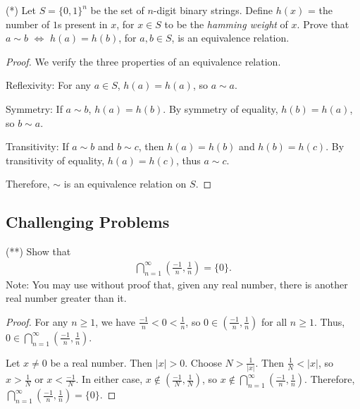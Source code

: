 \documentclass[12pt]{article}
\begin{document}
\begin{problem}
(*) Let $S = \{0,1\}^n$ be the set of $n$-digit binary strings. Define $h(x)$ = the number of $1$s present in $x$, for $x \in S$ to be the \emph{hamming weight} of $x$. Prove that $a \sim b$ $\iff$ $h(a) = h(b)$, for $a,b \in S$, is an equivalence relation.

\begin{proof}
We verify the three properties of an equivalence relation.

Reflexivity: For any $a \in S$, $h(a) = h(a)$, so $a \sim a$.

Symmetry: If $a \sim b$, $h(a) = h(b)$. By symmetry of equality, $h(b) = h(a)$, so $b \sim a$.

Transitivity: If $a \sim b$ and $b \sim c$, then $h(a) = h(b)$ and $h(b) = h(c)$. By transitivity of equality, $h(a) = h(c)$, thus $a \sim c$.

Therefore, $\sim$ is an equivalence relation on $S$.
\end{proof}
\end{problem}

\subsection*{Challenging Problems}

\begin{problem}
(**) Show that
\begin{align*}
\bigcap_{n=1}^\infty \left( \frac{-1}{n}, \frac{1}{n} \right) = \{0\}.
\end{align*}
Note: You may use without proof that, given any real number, there is another real number greater than it.

\begin{proof}
For any $n \geq 1$, we have $\frac{-1}{n} < 0 < \frac{1}{n}$, so $0 \in \left( \frac{-1}{n}, \frac{1}{n} \right)$ for all $n \geq 1$. Thus, $0 \in \bigcap_{n=1}^\infty \left( \frac{-1}{n}, \frac{1}{n} \right)$.

Let $x \neq 0$ be a real number. Then $|x| > 0$. Choose $N > \frac{1}{|x|}$. Then $\frac{1}{N} < |x|$, so $x > \frac{1}{N}$ or $x < \frac{-1}{N}$. In either case, $x \notin \left( \frac{-1}{N}, \frac{1}{N} \right)$, so $x \notin \bigcap_{n=1}^\infty \left( \frac{-1}{n}, \frac{1}{n} \right)$. Therefore, $\bigcap_{n=1}^\infty \left( \frac{-1}{n}, \frac{1}{n} \right) = \{0\}$.
\end{proof}
\end{problem}
\end{document}
